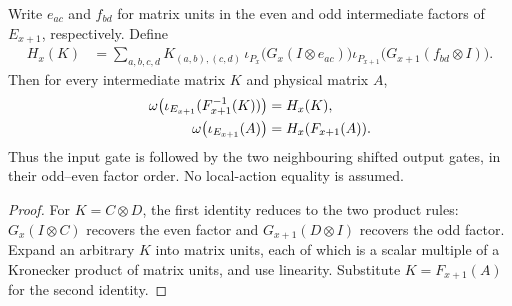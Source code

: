 \begin{lemma}
    \label{lem:qca_margolus_alternating_pair_rule}
    \leanok
    Write $e_{ac}$ and $f_{bd}$ for matrix units in the even and odd
    intermediate factors of $E_{x+1}$, respectively. Define
    \begin{align}
        H_x(K) & =\sum_{a,b,c,d}K_{(a,b),(c,d)}\,
        \iota_{P_x}\bigl(G_x(I\otimes e_{ac})\bigr)
        \iota_{P_{x+1}}\bigl(G_{x+1}(f_{bd}\otimes I)\bigr).
    \end{align}
    Then for every intermediate matrix $K$ and physical matrix $A$,
    \begin{align}
        \omega\bigl(\iota_{E_{x+1}}(F_{x+1}^{-1}(K))\bigr) & =H_x(K),\notag    \\
        \omega\bigl(\iota_{E_{x+1}}(A)\bigr)               & =H_x(F_{x+1}(A)).
    \end{align}
    Thus the input gate is followed by the two neighbouring shifted
    output gates, in their odd--even factor order. No local-action
    equality is assumed.
\end{lemma}
\begin{proof}
    \leanok
    For $K=C\otimes D$, the first identity reduces to the two product
    rules: $G_x(I\otimes C)$ recovers the even factor and
    $G_{x+1}(D\otimes I)$ recovers the odd factor. Expand an arbitrary
    $K$ into matrix units, each of which is a scalar multiple of a
    Kronecker product of matrix units, and use linearity. Substitute
    $K=F_{x+1}(A)$ for the second identity.
\end{proof}

